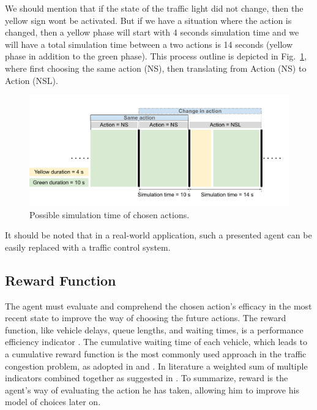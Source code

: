 \documentclass[conference]{IEEEtran}
\begin{document}
We should mention that if the state of the traffic light did not change, then the yellow sign wont be activated. But if we have a situation where the action is changed, then a yellow phase will start with 4 seconds simulation time and we will have a total simulation time between a two actions is 14 seconds (yellow phase in addition to the green phase). This process outline is depicted in Fig.~\ref{fig:5}, where first choosing the same action (NS), then translating from Action (NS) to Action (NSL).

\begin{figure}[H]
    \centering
    \begin{center}
    \includegraphics[scale=0.3]{images/Simulation steps.pdf}
    \end{center}
    \caption{Possible simulation time of chosen actions.}
    \label{fig:5}
\end{figure}

It should be noted that in a real-world application, such a presented agent can be easily replaced with a traffic control system. 

\subsection{Reward Function}
The agent must evaluate and comprehend the chosen action's efficacy in the most recent state to improve the way of choosing the future actions. The reward function, like vehicle delays, queue lengths, and waiting times, is a performance efficiency indicator \cite{Deep}. The cumulative waiting time of each vehicle, which leads to a cumulative reward function is the most commonly used approach in the traffic congestion problem, as adopted in \cite{genders2016using} and \cite{Deep}. In literature a weighted sum of multiple indicators combined together as suggested in \cite{Intellilight}. To summarize, reward is the agent's way of evaluating the action he has taken, allowing him to improve his model of choices later on. 
\end{document}
